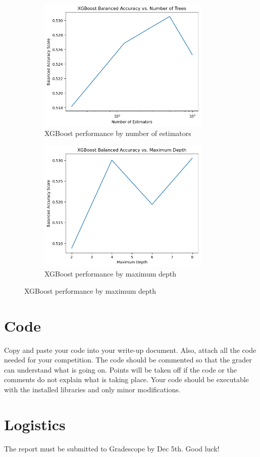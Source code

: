 \documentclass[12pt]{article}
\newtheorem{Proof of Lemma}{Proof of Lemma}
\begin{document}
\begin{figure}[H]
	\begin{subfigure}{.5\textwidth}
		\includegraphics*[width=0.9\textwidth]{../figures/xgb_estimators.png}
		\caption*{XGBoost performance by number of estimators}
	\end{subfigure}%
	\begin{subfigure}{.5\textwidth}
		\includegraphics*[width=0.9\textwidth]{../figures/xgb_maxdepth.png}
		\caption*{XGBoost performance by maximum depth}
	\end{subfigure}%
\end{figure}

\section{Code}
Copy and paste your code into your write-up document. Also, attach all the code needed for your competition. The code should be commented so that the grader can understand what is going on. Points will be taken off if the code or the comments do not explain what is taking place. Your code should be executable with the installed libraries and only minor modifications.

\section{Logistics}
The report must be submitted to Gradescope by Dec 5th. Good luck!
\end{document}
